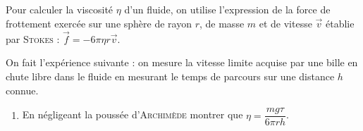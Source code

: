     \subsection{}
    
    Pour calculer la viscosité $\eta$ d'un fluide, on utilise l'expression de la force de frottement exercée sur une sphère de rayon $r$, de masse $m$ et de vitesse $\vec{v}$ établie par \textsc{Stokes} : \quad $\vec{f} = -6\pi\eta r \vec{v}$.
    
    On fait l'expérience suivante : on mesure la vitesse limite acquise par une bille en chute libre dans le fluide en mesurant le temps de parcours sur une distance $h$ connue. 
    
    \begin{enumerate}
        \item En négligeant la poussée d'\textsc{Archimède} montrer que $\eta = \dfrac{mg\tau}{6\pi rh}$.
        
        \noafter
\end{enumerate}
